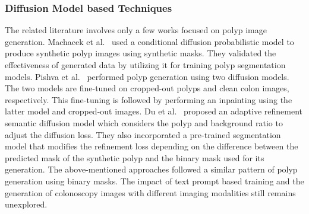 \subsubsection*{Diffusion Model based Techniques}
The related literature involves only a few works focused on polyp image generation. Machacek et al.~\cite{machavcek2023mask} used a conditional diffusion probabilistic model to produce synthetic polyp images using synthetic masks. They validated the effectiveness of generated data by utilizing it for training polyp segmentation models. Pishva et al.~\cite{pishva2023repolyp} performed polyp generation using two diffusion models. The two models are fine-tuned on cropped-out polyps and clean colon images, respectively. This fine-tuning is followed by performing an inpainting using the latter model and cropped-out images. Du et al.~\cite{du2023arsdm} proposed an adaptive reﬁnement semantic diﬀusion model which considers the polyp and background ratio to adjust the diffusion loss. They also incorporated a pre-trained segmentation model that modifies the refinement loss depending on the difference between the predicted mask of the synthetic polyp and the binary mask used for its generation. The above-mentioned approaches followed a similar pattern of polyp generation using binary masks. The impact of text prompt based training and the generation of colonoscopy images with different imaging modalities still remains unexplored.